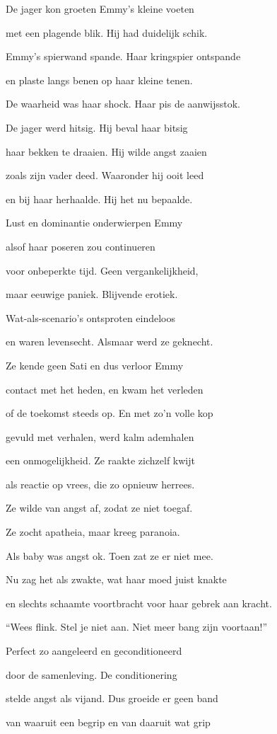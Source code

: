 De jager kon groeten
Emmy’s kleine voeten

met een plagende blik.
Hij had duidelijk schik.

Emmy’s spierwand spande.
Haar kringspier ontspande

en plaste langs benen
op haar kleine tenen.

De waarheid was haar shock.
Haar pis de aanwijsstok.

De jager werd hitsig.
Hij beval haar bitsig

haar bekken te draaien.
Hij wilde angst zaaien

zoals zijn vader deed.
Waaronder hij ooit leed

en bij haar herhaalde.
Hij het nu bepaalde.

Lust en dominantie
onderwierpen Emmy

alsof haar poseren
zou continueren

voor onbeperkte tijd.
Geen vergankelijkheid,

maar eeuwige paniek.
Blijvende erotiek.

Wat-als-scenario’s
ontsproten eindeloos

en waren levensecht.
Alsmaar werd ze geknecht.

Ze kende geen Sati
en dus verloor Emmy

contact met het heden,
en kwam het verleden

of de toekomst steeds op.
En met zo’n volle kop

gevuld met verhalen,
werd kalm ademhalen

een onmogelijkheid.
Ze raakte zichzelf kwijt

als reactie op vrees,
die zo opnieuw herrees.

Ze wilde van angst af,
zodat ze niet toegaf.

Ze zocht apatheia,
maar kreeg paranoia.

Als baby was angst ok.
Toen zat ze er niet mee.

Nu zag het als zwakte,
wat haar moed juist knakte

en slechts schaamte voortbracht
voor haar gebrek aan kracht.

“Wees flink. Stel je niet aan.
Niet meer bang zijn voortaan!”

Perfect zo aangeleerd
en geconditioneerd

door de samenleving.
De conditionering

stelde angst als vijand.
Dus groeide er geen band

van waaruit een begrip
en van daaruit wat grip

